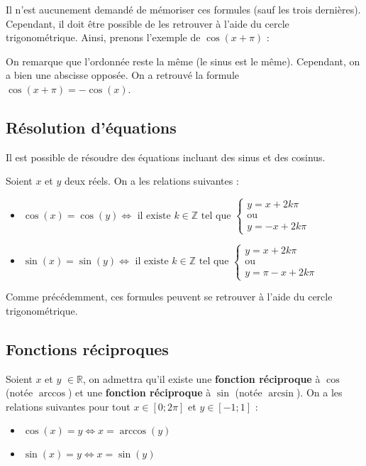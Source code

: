 	\begin{tip}
		Il n'est aucunement demandé de mémoriser ces formules (sauf les trois dernières). Cependant, il doit être possible de les retrouver à l'aide du cercle trigonométrique. Ainsi, prenons l'exemple de $\cos(x + \pi)$ :


		On remarque que l'ordonnée reste la même (le sinus est le même). Cependant, on a bien une abscisse opposée. On a retrouvé la formule $\cos(x + \pi) = -\cos(x)$.
	\end{tip}

	\subsection{Résolution d'équations}

	Il est possible de résoudre des équations incluant des sinus et des cosinus.

	\begin{formula}
		Soient $x$ et $y$ deux réels. On a les relations suivantes :
		\begin{itemize}
			\item $\cos(x) = \cos(y) \iff \text{ il existe } k \in \mathbb{Z} \text{ tel que } \begin{cases} y = x + 2k\pi \\ \text{ou} \\ y = -x + 2k\pi\end{cases}$
			\item $\sin(x) = \sin(y) \iff \text{ il existe } k \in \mathbb{Z} \text{ tel que } \begin{cases} y = x + 2k\pi \\ \text{ou} \\ y = \pi - x + 2k\pi\end{cases}$
		\end{itemize}
	\end{formula}

	Comme précédemment, ces formules peuvent se retrouver à l'aide du cercle trigonométrique.

	\subsection{Fonctions réciproques}

	\begin{formula}[Définition]
		Soient $x$ et $y$ $\in \mathbb{R}$, on admettra qu'il existe une \textbf{fonction réciproque} à $\cos$ (notée $\arccos$) et une \textbf{fonction réciproque} à $\sin$ (notée $\arcsin$). On a les relations suivantes pour tout $x \in [0; 2\pi]$ et $y \in [-1; 1]$ :
		\begin{itemize}
			\item $\cos(x) = y \iff x = \arccos(y)$
			\item $\sin(x) = y \iff x = \sin(y)$
		\end{itemize}
	\end{formula}

